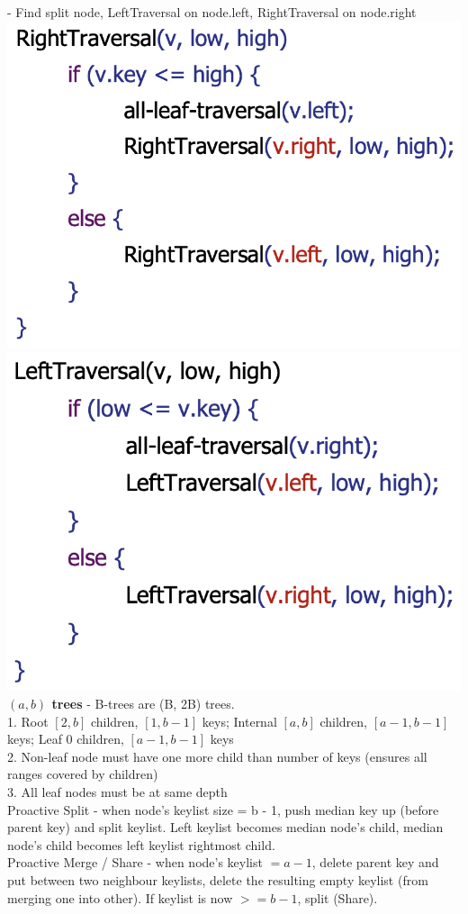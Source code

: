 \documentclass[10pt, a4paper]{article}
\begin{document}
\begin{multicols*}{3}
		- Find split node, LeftTraversal on node.left, RightTraversal on node.right\\
		\includegraphics[scale=.25]{RightTraversal} \includegraphics[scale=.25]{LeftTraversal}\\
		\textbf{$(a, b)$ trees} - B-trees are (B, 2B) trees.\\
		1. Root $[2, b]$ children, $[1, b-1]$ keys; Internal $[a, b]$ children, $[a - 1, b - 1]$ keys; Leaf 0 children, $[a - 1, b - 1]$ keys\\ 
		2. Non-leaf node must have one more child than number of keys (ensures all ranges covered by children)\\
		3. All leaf nodes must be at same depth\\
		Proactive Split - when node's keylist size = b - 1, push median key up (before parent key) and split keylist. Left keylist becomes median node's child, median node's child becomes left keylist rightmost child.\\
		Proactive Merge / Share - when node's keylist $= a - 1$, delete parent key and put between two neighbour keylists, delete the resulting empty keylist (from merging one into other). If keylist is now $>= b - 1$, split (Share).\\
	

\end{multicols*}
\end{document}
